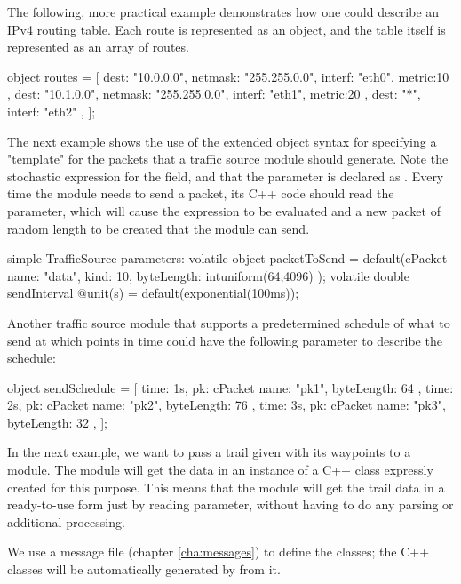 The following, more practical example demonstrates how one could describe an
IPv4 routing table. Each route is represented as an object, and the table itself
is represented as an array of routes.

\begin{ned}
object routes = [
    { dest: "10.0.0.0", netmask: "255.255.0.0", interf: "eth0", metric:10 },
    { dest: "10.1.0.0", netmask: "255.255.0.0", interf: "eth1", metric:20 },
    { dest: "*", interf: "eth2" },
];
\end{ned}

The next example shows the use of the extended object syntax for specifying a
"template" for the packets that a traffic source module should generate. Note
the stochastic expression for the  field, and that the parameter
is declared as . Every time the module needs to send a
packet, its C++ code should read the  parameter, which will
cause the expression to be evaluated and a new packet of random length to be
created that the module can send.

\begin{ned}
simple TrafficSource {
    parameters:
    volatile object packetToSend = default(cPacket {
        name: "data",
        kind: 10,
        byteLength: intuniform(64,4096)
    });
    volatile double sendInterval @unit(s) = default(exponential(100ms));
}
\end{ned}

Another traffic source module that supports a predetermined schedule of what to
send at which points in time could have the following parameter to describe the
schedule:

\begin{ned}
object sendSchedule = [
    { time: 1s, pk: cPacket { name: "pk1", byteLength: 64 } },
    { time: 2s, pk: cPacket { name: "pk2", byteLength: 76 } },
    { time: 3s, pk: cPacket { name: "pk3", byteLength: 32 } },
];
\end{ned}

In the next example, we want to pass a trail given with its waypoints to a
module. The module will get the data in an instance of a  C++ class
expressly created for this purpose. This means that the module will get the
trail data in a ready-to-use form just by reading parameter, without having to
do any parsing or additional processing.

We use a message file (chapter \ref{cha:messages}) to define the classes;
the C++ classes will be automatically generated by {\opp} from it.

